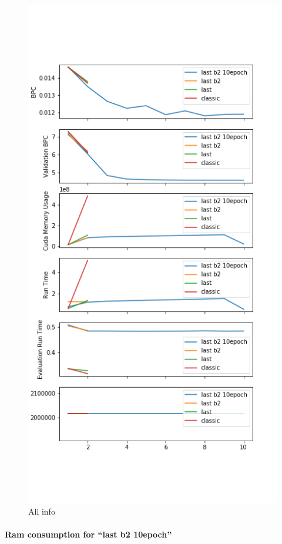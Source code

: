 \begin{figure}[H]
\centering
\includegraphics[height=.75\textheight]{parts/appendix/reports-gmsnn/docs_esteban-latex/test_reports/2018-06-12/history_frac.png}
\caption{All info}
\end{figure}

\paragraph{\texorpdfstring{Ram consumption for ``last b2 10epoch''}{Ram consumption for last b2 10epoch}}

